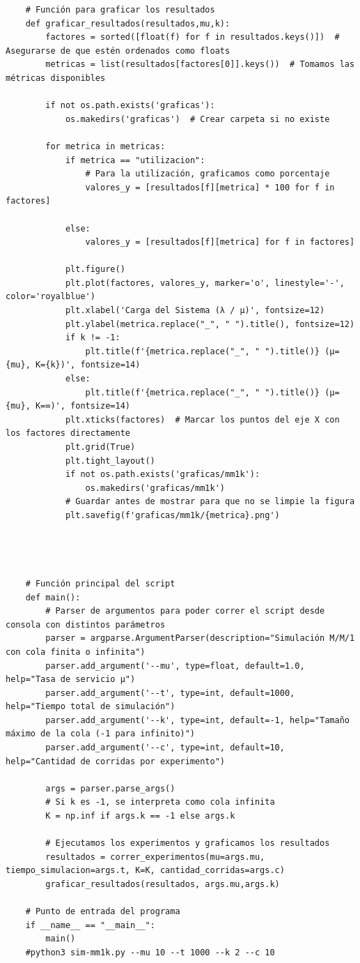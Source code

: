 \documentclass[12pt]{article}
\begin{document}
\begin{verbatim}
    # Función para graficar los resultados
    def graficar_resultados(resultados,mu,k):
        factores = sorted([float(f) for f in resultados.keys()])  # Asegurarse de que estén ordenados como floats
        metricas = list(resultados[factores[0]].keys())  # Tomamos las métricas disponibles
    
        if not os.path.exists('graficas'):
            os.makedirs('graficas')  # Crear carpeta si no existe
    
        for metrica in metricas:
            if metrica == "utilizacion":
                # Para la utilización, graficamos como porcentaje
                valores_y = [resultados[f][metrica] * 100 for f in factores]
    
            else:
                valores_y = [resultados[f][metrica] for f in factores]
    
            plt.figure()
            plt.plot(factores, valores_y, marker='o', linestyle='-', color='royalblue')
            plt.xlabel('Carga del Sistema (λ / μ)', fontsize=12)
            plt.ylabel(metrica.replace("_", " ").title(), fontsize=12)
            if k != -1:
                plt.title(f'{metrica.replace("_", " ").title()} (μ={mu}, K={k})', fontsize=14)
            else:
                plt.title(f'{metrica.replace("_", " ").title()} (μ={mu}, K=∞)', fontsize=14)
            plt.xticks(factores)  # Marcar los puntos del eje X con los factores directamente
            plt.grid(True)
            plt.tight_layout()
            if not os.path.exists('graficas/mm1k'):
                os.makedirs('graficas/mm1k')
            # Guardar antes de mostrar para que no se limpie la figura
            plt.savefig(f'graficas/mm1k/{metrica}.png')
    
    
    
    
    # Función principal del script
    def main():
        # Parser de argumentos para poder correr el script desde consola con distintos parámetros
        parser = argparse.ArgumentParser(description="Simulación M/M/1 con cola finita o infinita")
        parser.add_argument('--mu', type=float, default=1.0, help="Tasa de servicio μ")
        parser.add_argument('--t', type=int, default=1000, help="Tiempo total de simulación")
        parser.add_argument('--k', type=int, default=-1, help="Tamaño máximo de la cola (-1 para infinito)")
        parser.add_argument('--c', type=int, default=10, help="Cantidad de corridas por experimento")
    
        args = parser.parse_args()
        # Si k es -1, se interpreta como cola infinita
        K = np.inf if args.k == -1 else args.k
    
        # Ejecutamos los experimentos y graficamos los resultados
        resultados = correr_experimentos(mu=args.mu, tiempo_simulacion=args.t, K=K, cantidad_corridas=args.c)
        graficar_resultados(resultados, args.mu,args.k)
    
    # Punto de entrada del programa
    if __name__ == "__main__":
        main()
    #python3 sim-mm1k.py --mu 10 --t 1000 --k 2 --c 10   
\end{verbatim}
\end{document}
